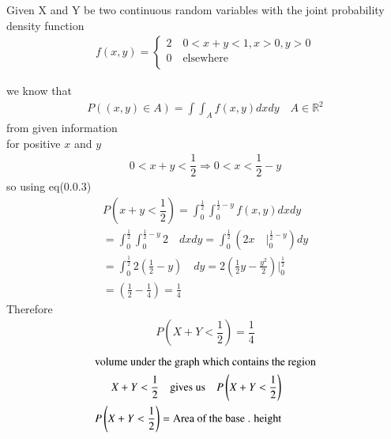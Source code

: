 Given X and Y be two continuous random variables with the joint probability density function
\begin{align}
    f\left(x,y\right)=\begin{cases}
    2 \quad  0<x+y<1 ,x>0 ,y>0\\
    0 \quad  \textrm{elsewhere}\\
    \end{cases}
\end{align}

we know that
\begin{align}
    P\left(\left(x,y\right)\in A\right)=\int \int _{A}f\left(x,y\right) dx dy \quad  A \in \mathbb{R}^2
\end{align}
from given information\\
for positive $x$ and $y$
\begin{align}
    0<x+y<\dfrac{1}{2}  \Rightarrow 0<x<\dfrac{1}{2}-y
\end{align}
so using eq(0.0.3)
\begin{align}
    P\left(x+y < \dfrac{1}{2}\right)=\int_{0}^{\frac{1}{2}} \int _{0}^{\frac{1}{2}-y}f(x,y) dx dy\\
    =\int_{0}^{\frac{1}{2}} \int _{0}^{\frac{1}{2}-y} 2 \quad dx dy
    =\int_{0}^{\frac{1}{2}} \left(  2 x \quad \big|_{0}^{\frac{1}{2}-y} \right)  dy\\
    =\int_{0}^{\frac{1}{2}}   2 \left(\frac{1}{2}-y\right) \quad    dy
    =2\left( \frac{1}{2} y - \frac{y^2}{2}  \right) \big|_{0}^{\frac{1}{2}}\\
    = \left( \frac{1}{2} - \frac{1}{4}\right) = \frac{1}{4} 
\end{align}
Therefore 
\begin{align}
    P\left(X+Y<\dfrac{1}{2}\right)=\dfrac{1}{4}
\end{align}
\begin{align}
\intertext{volume under the graph which contains the region} X+Y<\dfrac{1}{2} \quad \text{gives us} \quad P\left(X+Y<\dfrac{1}{2}\right) \\
 P\left(X+Y<\dfrac{1}{2}\right)= \text{Area of the base . height}
 \end{align}
 
